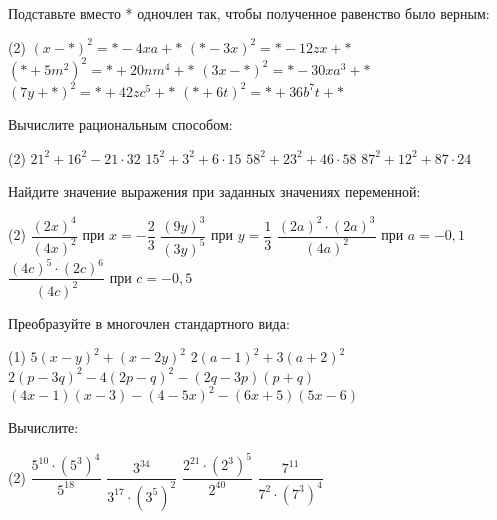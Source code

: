 \begin{class}[number=6]
	\begin{listofex}
		\item Подставьте вместо * одночлен так, чтобы полученное равенство было верным:
		\begin{tasks}(2)
			\task \( (x-*)^2=*-4xa+* \)
			\task \( (*-3x)^2=*-12zx+* \)
			\task \( (*+5m^2)^2=*+20nm^4+* \)
			\task \( (3x-*)^2=*-30xa^3+* \)
			\task \( (7y+*)^2=*+42zc^5+* \)
			\task \( (*+6t)^2=*+36b^7t+* \)
		\end{tasks}
		\item Вычислите рациональным способом:
		\begin{tasks}(2)
			\task \( 21^2+16^2 - 21 \cdot 32 \)
			\task \( 15^2 + 3^2 + 6 \cdot 15 \)
			\task \( 58^2+23^2+46 \cdot 58 \)
			\task \( 87^2+12^2+87 \cdot 24 \)
		\end{tasks}
		\item Найдите значение выражения при заданных значениях переменной:
		\begin{tasks}(2)
			\task \( \dfrac{(2x)^4}{(4x)^2} \) при \( x=-\dfrac{2}{3} \)
			\task \( \dfrac{(9y)^3}{(3y)^5} \) при \( y=\dfrac{1}{3} \)
			\task \( \dfrac{(2a)^2 \cdot (2a)^3}{(4a)^2} \) при \( a=-0,1 \)
			\task \( \dfrac{(4c)^5 \cdot (2c)^6}{(4c)^2} \) при \( c=-0,5 \)
		\end{tasks}
		\item Преобразуйте в многочлен стандартного вида:
		\begin{tasks}(1)
			\task \( 5(x-y)^2+(x-2y)^2 \)
			\task \( 2(a-1)^2+3(a+2)^2 \)
			\task \( 2(p-3q)^2-4(2p-q)^2-(2q-3p)(p+q) \)
			\task \( (4x-1)(x-3)-(4-5x)^2-(6x+5)(5x-6) \)
		\end{tasks}
		\item Вычислите:
		\begin{tasks}(2)
			\task \( \dfrac{5^{10} \cdot (5^3)^4}{5^{18}} \)
			\task \( \dfrac{3^{34}}{3^{17} \cdot (3^5)^2} \)
			\task \( \dfrac{2^{21} \cdot (2^3)^5}{2^{40}} \)
			\task \( \dfrac{7^{11}}{7^{2} \cdot (7^3)^4} \)
		\end{tasks}
		
	\end{listofex}
\end{class}

